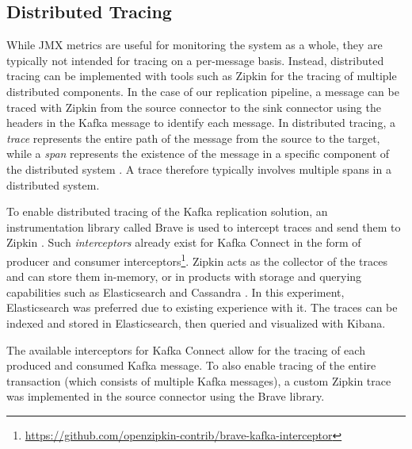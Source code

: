 
\subsection{Distributed Tracing}
While \ac{JMX} metrics are useful for monitoring the system as a whole, they are typically not intended for tracing on a per-message basis. Instead, distributed tracing can be implemented with tools such as Zipkin for the tracing of multiple distributed components. In the case of our replication pipeline, a message can be traced with Zipkin from the source connector to the sink connector using the headers in the Kafka message to identify each message. In distributed tracing, a \textit{trace} represents the entire path of the message from the source to the target, while a \textit{span} represents the existence of the message in a specific component of the distributed system \cite{janes2022zipkin}. A trace therefore typically involves multiple spans in a distributed system.

To enable distributed tracing of the Kafka replication solution, an instrumentation library called Brave is used to intercept traces and send them to Zipkin \cite{mallanna2020distributedzipkin}. Such \textit{interceptors} already exist for Kafka Connect in the form of producer and consumer interceptors\footnote{\url{https://github.com/openzipkin-contrib/brave-kafka-interceptor}}. 
Zipkin acts as the collector of the traces and can store them in-memory, or in products with storage and querying capabilities such as Elasticsearch and Cassandra \cite{mallanna2020distributedzipkin}. In this experiment, Elasticsearch was preferred due to existing experience with it. The traces can be indexed and stored in Elasticsearch, then queried and visualized with Kibana. %

The available interceptors for Kafka Connect allow for the tracing of each produced and consumed Kafka message. To also enable tracing of the entire transaction (which consists of multiple Kafka messages), a custom Zipkin trace was implemented in the source connector using the Brave library.





